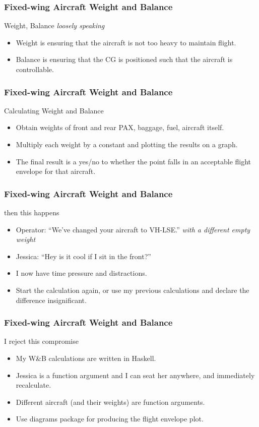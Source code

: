 \begin{frame}
\frametitle{Fixed-wing Aircraft Weight and Balance}
\begin{block}{Weight, Balance \emph{\tiny{loosely speaking}}}
\begin{itemize}
\item Weight is ensuring that the aircraft is not too heavy to maintain flight.
\item Balance is ensuring that the CG is positioned such that the aircraft is controllable.
\end{itemize}
\end{block}
\end{frame}

\begin{frame}
\frametitle{Fixed-wing Aircraft Weight and Balance}
\begin{block}{Calculating Weight and Balance}
\begin{itemize}
\item<1-> Obtain weights of front and rear PAX, baggage, fuel, aircraft itself.
\item<2-> Multiply each weight by a constant and plotting the results on a graph.
\item<3-> The final result is a yes/no to whether the point falls in an acceptable flight envelope for that aircraft.
\end{itemize}
\end{block}
\end{frame}
\begin{frame}

\frametitle{Fixed-wing Aircraft Weight and Balance}
\begin{block}{then this happens}
\begin{itemize}
\item<1-> Operator: ``We've changed your aircraft to VH-LSE.'' \emph{with a different empty weight}
\item<2-> Jessica: ``Hey is it cool if I sit in the front?''
\item<3-> I now have time pressure and distractions.
\item<3-> Start the calculation again, or use my previous calculations and declare the difference insignificant.
\end{itemize}
\end{block}
\end{frame}

\begin{frame}
\frametitle{Fixed-wing Aircraft Weight and Balance}
\begin{block}{I reject this compromise}
\begin{itemize}
\item<1-> My W\&B calculations are written in Haskell.
\item<2-> Jessica is a function argument and I can seat her anywhere, and immediately recalculate.
\item<3-> Different aircraft (and their weights) are function arguments.
\item<4-> Use diagrams package for producing the flight envelope plot.
\end{itemize}
\end{block}
\end{frame}

